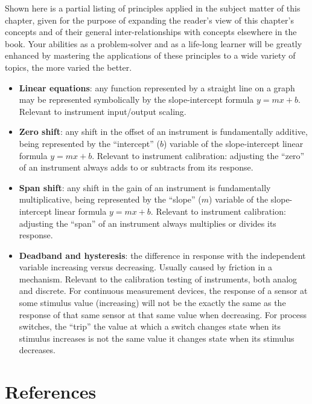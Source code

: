 Shown here is a partial listing of principles applied in the subject matter of this chapter, given for the purpose of expanding the reader's view of this chapter's concepts and of their general inter-relationships with concepts elsewhere in the book.  Your abilities as a problem-solver and as a life-long learner will be greatly enhanced by mastering the applications of these principles to a wide variety of topics, the more varied the better.

\begin{itemize}
\item \textbf{Linear equations}: any function represented by a straight line on a graph may be represented symbolically by the slope-intercept formula $y = mx + b$.  Relevant to instrument input/output scaling.
\item \textbf{Zero shift}: any shift in the offset of an instrument is fundamentally additive, being represented by the ``intercept'' ($b$) variable of the slope-intercept linear formula $y = mx + b$.  Relevant to instrument calibration: adjusting the ``zero'' of an instrument always adds to or subtracts from its response.
\item \textbf{Span shift}: any shift in the gain of an instrument is fundamentally multiplicative, being represented by the ``slope'' ($m$) variable of the slope-intercept linear formula $y = mx + b$.  Relevant to instrument calibration: adjusting the ``span'' of an instrument always multiplies or divides its response.
\item \textbf{Deadband and hysteresis}: the difference in response with the independent variable increasing versus decreasing.  Usually caused by friction in a mechanism.  Relevant to the calibration testing of instruments, both analog and discrete.  For continuous measurement devices, the response of a sensor at some stimulus value (increasing) will not be the exactly the same as the response of that same sensor at that same value when decreasing.  For process switches, the ``trip'' the value at which a switch changes state when its stimulus increases is not the same value it changes state when its stimulus decreases.
\end{itemize}









\filbreak
\section*{References}

